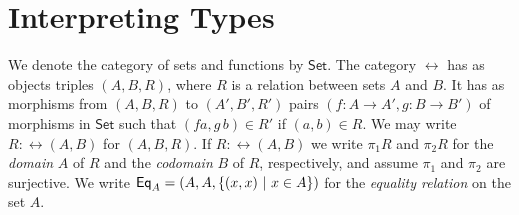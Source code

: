 \documentclass[runningheads]{llncs}
\newcommand{\set}{\mathsf{Set}}
\newcommand{\map}{\mathsf{map}}
\newcommand{\fold}{\mathsf{fold}}
\begin{document}
\begin{comment}
$\mathit{flatten}$ function is typeable as follows:
\[\begin{array}{l}
\AXC{$\Gamma;\alpha,\beta \vdash \mathit{List} \, \alpha$}
\AXC{$\Gamma;\beta \vdash \mathit{PTree}\,\beta \hspace*{0.3in}
  \Gamma;\beta \vdash \mathit{List}\,\beta$}
\BIC{$\Gamma;\emptyset~|~\emptyset \vdash
  \map^{F,G}_{\mathit{List}\,\alpha}  : \Nat^\emptyset
  (\Nat^\beta(\mathit{PTree}\, 
  \beta)\,(\mathit{List}\, \beta))\,
 (\Nat^\beta\,(\mathit{List}\,
  (\mathit{PTree}\, \beta))\,(\mathit{List}\, (\mathit{List}\,
  \beta)))$}
\DisplayProof
\end{array}\]
Similar remarks explain the appearance of $\ol \gamma$ in the typing
rules for $\tin$ and $\fold$.

\end{comment}

\vspace*{-0.1in}

\section{Interpreting Types}\label{sec:type-interp}

\vspace*{-0.1in}

We denote the category of sets and functions by $\set$. The category
$\rel$ has as objects triples $(A,B,R)$, where $R$ is a relation
between sets $A$ and $B$.
It has as morphisms from $(A,B,R)$ to $(A',B',R')$ pairs $(f : A \to
A',g : B \to B')$ of morphisms in $\set$ such that $(f a,g\,b) \in R'$
if $(a,b) \in R$. We may write $R : \rel(A,B)$ for $(A,B,R)$.
If $R : \rel(A,B)$ we write $\pi_1 R$ and $\pi_2 R$ for the {\em
  domain} $A$ of $R$ and the {\em codomain} $B$ of $R$, respectively,
and assume $\pi_1$ and $\pi_2$ are surjective. We write $\mathsf{Eq}_A =
(A,A,\{(x,x)~|~ x \in A\})$ for the {\em equality relation} on the set
$A$.
\end{document}
